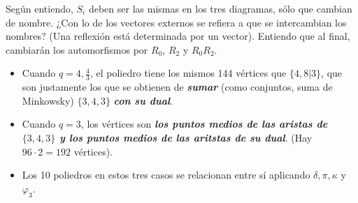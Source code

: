 \documentclass[spanish]{article}
\theoremstyle{definition}
\begin{document}
Según entiendo, $S_i$ deben ser las mismas en los tres diagramas, sólo que cambian de nombre. ¿Con lo de los vectores externos se refiera a que se intercambian los nombres? (Una reflexión está determinada por un vector). Entiendo que al final, cambiarán los automorfismos por $R_0$, $R_2$ y $R_0R_2$.

\begin{itemize}
	\item Cuando $q=4,\frac{4}{3}$, el poliedro tiene los mismos 144 vértices que $\{4,8|3\}$, que son justamente los que se obtienen de \textbf{\textit{sumar}} (como conjuntos, suma de Minkowsky) $\{3,4,3\}$ \textbf{\textit{con su dual}}.
	\item Cuando $q=3$, los vértices son \textbf{\textit{los puntos medios de las aristas de $\{3,4,3\}$ y los puntos medios de las aritstas de su dual}}. (Hay $96\cdot2=192$ vértices).
	\item Los 10 poliedros en estos tres casos se relacionan entre sí aplicando $\delta,\pi,\kappa$ y $\varphi_3$.
	
\end{itemize}
\end{document}
